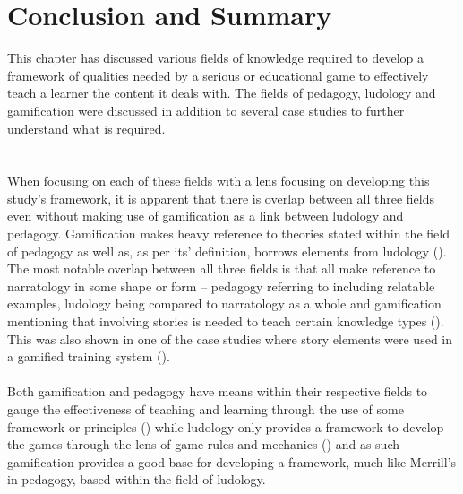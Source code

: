 \section{Conclusion and Summary}
This chapter has discussed various fields of knowledge required to develop a framework of qualities needed by a serious or educational game to effectively teach a learner the content it deals with. The fields of pedagogy, ludology and gamification were discussed in addition to several case studies to further understand what is required. 
\\\\\\
When focusing on each of these fields with a lens focusing on developing this study’s framework, it is apparent that there is overlap between all three fields even without making use of gamification as a link between ludology and pedagogy. Gamification makes heavy reference to theories stated within the field of pedagogy as well as, as per its’ definition, borrows elements from ludology (\cite{KappArticle2012}). The most notable overlap between all three fields is that all make reference to narratology in some shape or form – pedagogy referring to including relatable examples, ludology being compared to narratology as a whole and gamification mentioning that involving stories is needed to teach certain knowledge types (\cite{Dincelli2020, Frasca2013, Kapp2012a, Sheng2007}). This was also shown in one of the case studies where story elements were used in a gamified training system (\cite{Dincelli2020, Sheng2007}). 
\\\\
Both gamification and pedagogy have means within their respective fields to gauge the effectiveness of teaching and learning through the use of some framework or principles (\cite{Kapp2012a, Merrill2002, Reigeluth1996}) while ludology only provides a framework to develop the games through the lens of game rules and mechanics (\cite{DeGloria2014}) and as such gamification provides a good base for developing a framework, much like Merrill’s in pedagogy, based within the field of ludology.


